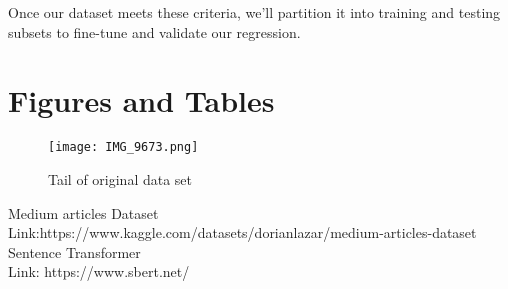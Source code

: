\documentclass[conference]{IEEEtran}
\begin{document}
Once our dataset meets these criteria, we'll partition it into training and testing subsets to fine-tune and validate our regression.

\section{Figures and Tables}


\begin{figure}[htbp]
\centerline{\texttt{[image: IMG\_9673.png]}}
\caption{Tail of original data set}
\label{fig}
\end{figure}


\begin{thebibliography}{00}
 Medium articles Dataset \\
Link:https://www.kaggle.com/datasets/dorianlazar/medium-articles-dataset
 Sentence Transformer \\
Link: https://www.sbert.net/
\end{thebibliography}
\vspace{12pt}
\end{document}
